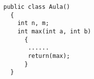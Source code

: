 \documentclass{report}
\def\darius{\textsf{Darius}\xspace}
\def\antlr{\texttt{AnTLR}\xspace}
\begin{document}


\begin{verbatim}
public class Aula()
  {
    int n, m;
    int max(int a, int b)
      {
       ......
       return(max);
      }
  }
\end{verbatim}




%
%
\end{document}
